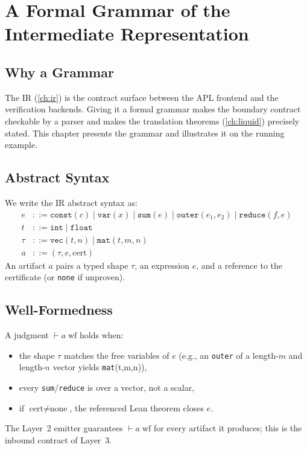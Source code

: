 \chapter{A Formal Grammar of the Intermediate Representation}
\label{ch:ir-grammar}

\section{Why a Grammar}
\label{sec:irg-why}

The IR (\cref{ch:ir}) is the contract surface between the APL frontend and
the verification backends. Giving it a formal grammar makes the boundary
contract checkable by a parser and makes the translation theorems
(\cref{ch:liquid}) precisely stated. This chapter presents the grammar and
illustrates it on the running example.

\section{Abstract Syntax}
\label{sec:irg-syntax}

We write the IR abstract syntax as:
\begin{align*}
e &::= \texttt{const}(c) \mid \texttt{var}(x) \mid
       \texttt{sum}(e) \mid \texttt{outer}(e_1, e_2) \mid
       \texttt{reduce}(f, e) \\
t &::= \texttt{int} \mid \texttt{float} \\
\tau &::= \texttt{vec}(t, n) \mid \texttt{mat}(t, m, n) \\
a &::= (\tau, e, \text{cert})
\end{align*}
An artifact $a$ pairs a typed shape $\tau$, an expression $e$, and a
reference to the certificate (or \texttt{none} if unproven).

\section{Well-Formedness}
\label{sec:irg-wf}

A judgment $\vdash a\;\text{wf}$ holds when:
\begin{itemize}
  \item the shape $\tau$ matches the free variables of $e$ (e.g., an
        \texttt{outer} of a length-$m$ and length-$n$ vector yields
        \texttt{mat}(t,m,n)),
  \item every \texttt{sum}/\texttt{reduce} is over a vector, not a scalar,
  \item if $\text{cert} \neq \text{none}$, the referenced Lean theorem
        closes $e$.
\end{itemize}
The Layer~2 emitter guarantees $\vdash a\;\text{wf}$ for every artifact it
produces; this is the inbound contract of Layer~3.

